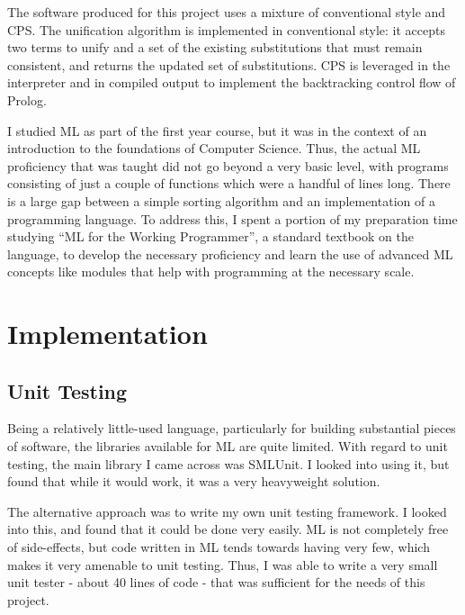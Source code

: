 \documentclass[12pt]{article}
\begin{document}
The software produced for this project uses a mixture of conventional style and CPS. The unification algorithm is implemented in conventional style: it accepts two terms to unify and a set of the existing substitutions that must remain consistent, and returns the updated set of substitutions. CPS is leveraged in the interpreter and in compiled output to implement the backtracking control flow of Prolog.


I studied ML as part of the first year course, but it was in the context of an introduction to the foundations of Computer Science. Thus, the actual ML proficiency that was taught did not go beyond a very basic level, with programs consisting of just a couple of functions which were a handful of lines long. There is a large gap between a simple sorting algorithm and an implementation of a programming language. To address this, I spent a portion of my preparation time studying ``ML for the Working Programmer'', a standard textbook on the language, to develop the necessary proficiency and learn the use of advanced ML concepts like modules that help with programming at the necessary scale.

\newpage

\section{Implementation}



\subsection{Unit Testing}

Being a relatively little-used language, particularly for building substantial pieces of software, the libraries available for ML are quite limited. With regard to unit testing, the main library I came across was SMLUnit. I looked into using it, but found that while it would work, it was a very heavyweight solution.

The alternative approach was to write my own unit testing framework. I looked into this, and found that it could be done very easily. ML is not completely free of side-effects, but code written in ML tends towards having very few, which makes it very amenable to unit testing. Thus, I was able to write a very small unit tester - about 40 lines of code - that was sufficient for the needs of this project.
\end{document}
